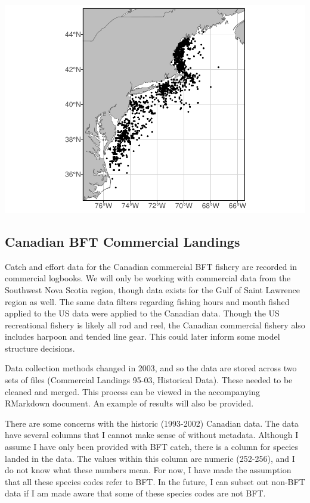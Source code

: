 \documentclass[
]{article}
\let\origfigure\figure
\let\endorigfigure\endfigure
\renewenvironment{figure}[1][2] {
    \expandafter\origfigure\expandafter[H]
} {
    \endorigfigure
}
\begin{document}
\begin{figure}
\centering
\includegraphics{Model_Prelim_Report_files/figure-latex/americanplot-1.pdf}
\caption{\label{fig:americanplot}Fig. 2: Spatial distribution of American recreational catch}
\end{figure}

\hypertarget{canadian-bft-commercial-landings}{%
\subsection{Canadian BFT Commercial Landings}\label{canadian-bft-commercial-landings}}

Catch and effort data for the Canadian commercial BFT fishery are recorded in commercial logbooks. We will only be working with commercial data from the Southwest Nova Scotia region, though data exists for the Gulf of Saint Lawrence region as well. The same data filters regarding fishing hours and month fished applied to the US data were applied to the Canadian data. Though the US recreational fishery is likely all rod and reel, the Canadian commercial fishery also includes harpoon and tended line gear. This could later inform some model structure decisions.

Data collection methods changed in 2003, and so the data are stored across two sets of files (Commercial Landings 95-03, Historical Data). These needed to be cleaned and merged. This process can be viewed in the accompanying RMarkdown document. An example of results will also be provided.

There are some concerns with the historic (1993-2002) Canadian data. The data have several columns that I cannot make sense of without metadata. Although I assume I have only been provided with BFT catch, there is a column for species landed in the data. The values within this column are numeric (252-256), and I do not know what these numbers mean. For now, I have made the assumption that all these species codes refer to BFT. In the future, I can subset out non-BFT data if I am made aware that some of these species codes are not BFT.
\end{document}
